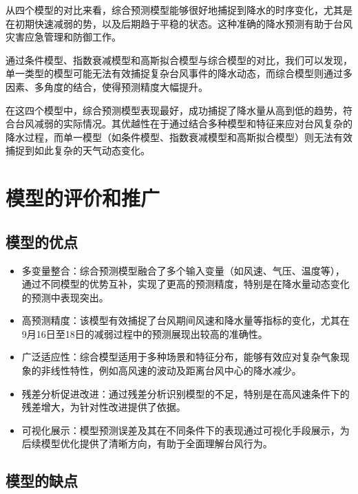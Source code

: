 \documentclass[withoutpreface,bwprint]{cumcmthesis}
\begin{document}
    从四个模型的对比来看，综合预测模型能够很好地捕捉到降水的时序变化，尤其是在初期快速减弱的势，以及后期趋于平稳的状态。这种准确的降水预测有助于台风灾害应急管理和防御工作。

    通过条件模型、指数衰减模型和高斯拟合模型与综合模型的对比，我们可以发现，单一类型的模型可能无法有效捕捉复杂台风事件的降水动态，而综合模型则通过多因素、多角度的结合，使得预测精度大幅提升。

    在这四个模型中，综合预测模型表现最好，成功捕捉了降水量从高到低的趋势，符合台风减弱的实际情况。其优越性在于通过结合多种模型和特征来应对台风复杂的降水过程，而单一模型（如条件模型、指数衰减模型和高斯拟合模型）则无法有效捕捉到如此复杂的天气动态变化。
    


\newpage
\section{模型的评价和推广}

\subsection{模型的优点}
\begin{itemize}[itemindent=2em]
\item 多变量整合：综合预测模型融合了多个输入变量（如风速、气压、温度等），通过不同模型的优势互补，实现了更高的预测精度，特别是在降水量动态变化的预测中表现突出。

\item 高预测精度：该模型有效捕捉了台风期间风速和降水量等指标的变化，尤其在9月16日至18日的减弱过程中的预测展现出较高的准确性。

\item 广泛适应性：综合模型适用于多种场景和特征分布，能够有效应对复杂气象现象的非线性特性，例如高风速的波动及距离台风中心的降水减少。

\item 残差分析促进改进：通过残差分析识别模型的不足，特别是在高风速条件下的残差增大，为针对性改进提供了依据。

\item 可视化展示：模型预测误差及其在不同条件下的表现通过可视化手段展示，为后续模型优化提供了清晰方向，有助于全面理解台风行为。

\end{itemize}

\subsection{模型的缺点}
\end{document}
